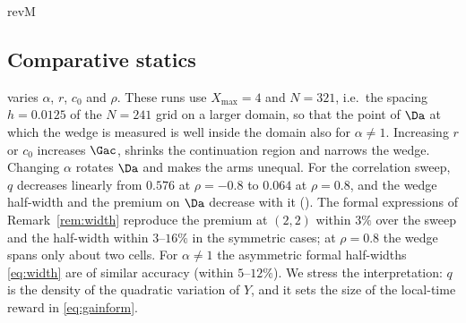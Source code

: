 \begin{rv}{revM}{}
\subsection{Comparative statics}

 varies $\alpha$, $r$, $c_0$ and $\rho$. These runs use $X_{\max}=4$ and $N=321$, i.e.\
the spacing $h=0.0125$ of the $N=241$ grid on a larger domain, so that the point of $\Da$ at which the
wedge is measured is well inside the domain also for $\alpha\ne1$. Increasing $r$ or $c_0$
increases $\Gac$, shrinks the continuation region and narrows the wedge. Changing $\alpha$ rotates
$\Da$ and makes the arms unequal. For the correlation sweep, $q$ decreases linearly from $0.576$ at
$\rho=-0.8$ to $0.064$ at $\rho=0.8$, and the wedge half-width and the premium on $\Da$ decrease
with it (\Cref{fig:rho}). The formal expressions of Remark~\ref{rem:width} reproduce the premium at
$(2,2)$ within $3\%$ over the sweep and the half-width within $3$--$16\%$ in the symmetric
cases; at $\rho=0.8$ the wedge spans only about two cells. For $\alpha\ne1$
the asymmetric formal half-widths \eqref{eq:width} are of similar accuracy (within $5$--$12\%$). We stress the interpretation:
$q$ is the density of the quadratic variation of $Y$, and it sets the size of the local-time reward
in \eqref{eq:gainform}. 


\end{rv}
